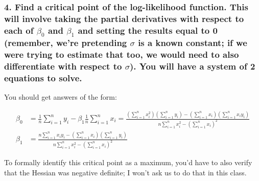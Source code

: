 \documentclass[]{article}
\begin{document}
\subsubsection{\texorpdfstring{4. Find a critical point of the
log-likelihood function. This will involve taking the partial
derivatives with respect to each of \(\beta_0\) and \(\beta_1\) and
setting the results equal to 0 (remember, we're pretending \(\sigma\) is
a known constant; if we were trying to estimate that too, we would need
to also differentiate with respect to \(\sigma\)). You will have a
system of 2 equations to
solve.}{4. Find a critical point of the log-likelihood function. This will involve taking the partial derivatives with respect to each of \textbackslash{}beta\_0 and \textbackslash{}beta\_1 and setting the results equal to 0 (remember, we're pretending \textbackslash{}sigma is a known constant; if we were trying to estimate that too, we would need to also differentiate with respect to \textbackslash{}sigma). You will have a system of 2 equations to solve.}}\label{find-a-critical-point-of-the-log-likelihood-function.-this-will-involve-taking-the-partial-derivatives-with-respect-to-each-of-beta_0-and-beta_1-and-setting-the-results-equal-to-0-remember-were-pretending-sigma-is-a-known-constant-if-we-were-trying-to-estimate-that-too-we-would-need-to-also-differentiate-with-respect-to-sigma.-you-will-have-a-system-of-2-equations-to-solve.}

You should get answers of the form:

\begin{align*}
\beta_0 &= \frac{1}{n}\sum_{i = 1}^n y_i - \beta_1 \frac{1}{n} \sum_{i = 1}^n x_i = \frac{\left(\sum_{i = 1}^n x_i^2\right) \left(\sum_{i = 1}^n y_i\right) - \left(\sum_{i = 1}^n x_i\right) \left(\sum_{i = 1}^n x_i y_i \right)}{n \sum_{i = 1}^n x_i^2 - \left(\sum_{i = 1}^n x_i\right)^2} \\
\beta_1 &= \frac{n \sum_{i = 1}^n x_i y_i - \left(\sum_{i = 1}^n x_i\right) \left(\sum_{i = 1}^n y_i\right)}{n \sum_{i = 1}^n x_i^2 - \left(\sum_{i = 1}^n x_i\right)^2}
\end{align*}

\vspace{8.25cm}

To formally identify this critical point as a maximum, you'd have to
also verify that the Hessian was negative definite; I won't ask us to do
that in this class.
\end{document}
